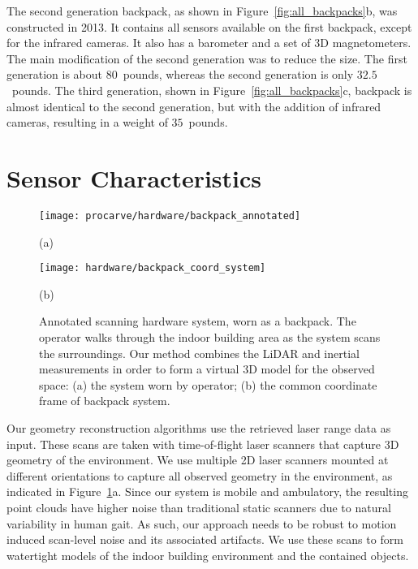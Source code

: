 \documentclass[12pt,onecolumn,oneside]{book}
\begin{document}
The second generation backpack, as shown in Figure~\ref{fig:all_backpacks}b, was constructed in 2013.  It contains all sensors available on the first backpack, except for the infrared cameras.  It also has a barometer and a set of 3D magnetometers.  The main modification of the second generation was to reduce the size.  The first generation is about $80$~pounds, whereas the second generation is only $32.5$~pounds.  The third generation, shown in Figure~\ref{fig:all_backpacks}c, backpack is almost identical to the second generation, but with the addition of infrared cameras, resulting in a weight of $35$~pounds.

\section{Sensor Characteristics}
\label{sec:sensor_specs}

\begin{figure}[t]

	\begin{minipage}[c]{0.54\linewidth}
		\centerline{\texttt{[image: procarve/hardware/backpack\_annotated]}}
		\centerline{(a)}\medskip
	\end{minipage}
	\hfill
	\begin{minipage}[c]{0.46\linewidth}
		\centerline{\texttt{[image: hardware/backpack\_coord\_system]}}
		\centerline{(b)}\medskip
	\end{minipage}

	\caption[Annotated scanning hardware system.]{Annotated scanning hardware system, worn as a backpack.  The operator walks through the indoor building area as the system scans the surroundings.  Our method combines the LiDAR and inertial measurements in order to form a virtual 3D model for the observed space:  (a) the system worn by operator; (b) the common coordinate frame of backpack system.}
	\label{fig:backpack}
\end{figure}

Our geometry reconstruction algorithms use the retrieved laser range data as input.  These scans are taken with time-of-flight laser scanners that capture 3D geometry of the environment.  We use multiple 2D laser scanners mounted at different orientations to capture all observed geometry in the environment, as indicated in Figure~\ref{fig:backpack}a.  Since our system is mobile and ambulatory, the resulting point clouds have higher noise than traditional static scanners due to natural variability in human gait.  As such, our approach needs to be robust to motion induced scan-level noise and its associated artifacts.  We use these scans to form watertight models of the indoor building environment and the contained objects.
\end{document}
